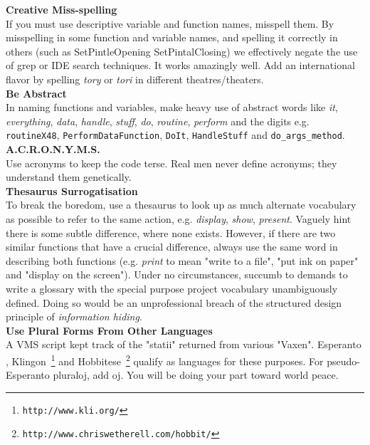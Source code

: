 \documentclass[11pt,twoside,a4paper]{article}
\begin{document}
\clearpage

\textbf{Creative Miss-spelling}~\\
If you must use descriptive variable and function names, misspell them. By misspelling in some function and variable names, and spelling it correctly in others (such as SetPintleOpening SetPintalClosing) we effectively negate the use of grep or IDE search techniques. It works amazingly well. Add an international flavor by spelling \emph{tory} or \emph{tori} in different theatres/theaters.~\\ 

\textbf{Be Abstract}~\\
In naming functions and variables, make heavy use of abstract words like \emph{it}, \emph{everything}, \emph{data}, \emph{handle}, \emph{stuff}, \emph{do}, \emph{routine}, \emph{perform} and the digits e.g. \texttt{routineX48}, \texttt{PerformDataFunction}, \texttt{DoIt}, \texttt{HandleStuff} and \texttt{do\_args\_method}.~\\ 

\textbf{A.C.R.O.N.Y.M.S.}~\\
Use acronyms to keep the code terse. Real men never define acronyms; they understand them genetically.~\\ 

\textbf{Thesaurus Surrogatisation}~\\
To break the boredom, use a thesaurus to look up as much alternate vocabulary as possible to refer to the same action, e.g. \emph{display}, \emph{show}, \emph{present}. Vaguely hint there is some subtle difference, where none exists. However, if there are two similar functions that have a crucial difference, always use the same word in describing both functions (e.g. \emph{print} to mean "write to a file", "put ink on paper" and "display on the screen"). Under no circumstances, succumb to demands to write a glossary with the special purpose project vocabulary unambiguously defined. Doing so would be an unprofessional breach of the structured design principle of \emph{information hiding}.~\\ 

\textbf{Use Plural Forms From Other Languages}~\\
A VMS script kept track of the "statii" returned from various "Vaxen". Esperanto , Klingon~\footnote{\texttt{http://www.kli.org/}} and Hobbitese~\footnote{\texttt{http://www.chriswetherell.com/hobbit/}} qualify as languages for these purposes. For pseudo-Esperanto pluraloj, add oj. You will be doing your part toward world peace.~\\ 
\end{document}
